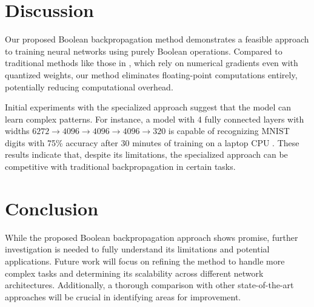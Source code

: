 \documentclass[pmlr]{jmlr}
\begin{document}
\section{Discussion}
Our proposed Boolean backpropagation method demonstrates a feasible approach to training neural networks using purely Boolean operations. Compared to traditional methods like those in \cite{rastegari2016}, which rely on numerical gradients even with quantized weights, our method eliminates floating-point computations entirely, potentially reducing computational overhead.

Initial experiments with the specialized approach suggest that the model can learn complex patterns. For instance, a model with 4 fully connected layers with widths \( 6272 \rightarrow 4096 \rightarrow 4096 \rightarrow 4096 \rightarrow 320 \) is capable of recognizing MNIST digits with 75\% accuracy after 30 minutes of training on a laptop CPU \cite{bbp-research-mnist}. These results indicate that, despite its limitations, the specialized approach can be competitive with traditional backpropagation in certain tasks.

\section{Conclusion}
While the proposed Boolean backpropagation approach shows promise, further investigation is needed to fully understand its limitations and potential applications. Future work will focus on refining the method to handle more complex tasks and determining its scalability across different network architectures. Additionally, a thorough comparison with other state-of-the-art approaches will be crucial in identifying areas for improvement.


\end{document}
